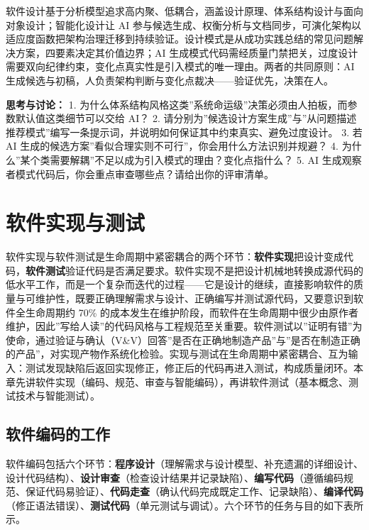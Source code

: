 \documentclass[12pt,a4paper,twoside,openany]{ctexbook}
\numberwithin{figure}{chapter}
\numberwithin{table}{chapter}
\begin{document}
软件设计基于分析模型追求高内聚、低耦合，涵盖设计原理、体系结构设计与面向对象设计；智能化设计让
AI
参与候选生成、权衡分析与文档同步，可演化架构以适应度函数把架构治理迁移到持续验证。设计模式是从成功实践总结的常见问题解决方案，四要素决定其价值边界；AI
生成模式代码需经质量门禁把关，过度设计需要双向纪律约束，变化点真实性是引入模式的唯一理由。两者的共同原则：AI
生成候选与初稿，人负责架构判断与变化点裁决------验证优先，决策在人。

\textbf{思考与讨论：} 1.
为什么体系结构风格这类''系统命运级''决策必须由人拍板，而参数默认值这类细节可以交给
AI？ 2.
请分别为''候选设计方案生成''与''从问题描述推荐模式''编写一条提示词，并说明如何保证其中约束真实、避免过度设计。
3. 若 AI
生成的候选方案''看似合理实则不可行''，你会用什么方法识别并规避？ 4.
为什么''某个类需要解耦''不足以成为引入模式的理由？变化点指什么？ 5. AI
生成观察者模式代码后，你会重点审查哪些点？请给出你的评审清单。

\chapter{软件实现与测试}\label{ux8f6fux4ef6ux5b9eux73b0ux4e0eux6d4bux8bd5}

软件实现与软件测试是生命周期中紧密耦合的两个环节：\textbf{软件实现}把设计变成代码，\textbf{软件测试}验证代码是否满足要求。软件实现不是把设计机械地转换成源代码的低水平工作，而是一个复杂而迭代的过程------它是设计的继续，直接影响软件的质量与可维护性，既要正确理解需求与设计、正确编写并测试源代码，又要意识到软件全生命周期约
70\%
的成本发生在维护阶段，而软件在生命周期中很少由原作者维护，因此''写给人读''的代码风格与工程规范至关重要。软件测试以''证明有错''为使命，通过验证与确认（V\&V）回答''是否在正确地制造产品''与''是否在制造正确的产品''，对实现产物作系统化检验。实现与测试在生命周期中紧密耦合、互为输入：测试发现缺陷后返回实现修正，修正后的代码再进入测试，构成质量闭环。本章先讲软件实现（编码、规范、审查与智能编码），再讲软件测试（基本概念、测试技术与智能测试）。

\section{软件编码的工作}\label{ux8f6fux4ef6ux7f16ux7801ux7684ux5de5ux4f5c}

软件编码包括六个环节：\textbf{程序设计}（理解需求与设计模型、补充遗漏的详细设计、设计代码结构）、\textbf{设计审查}（检查设计结果并记录缺陷）、\textbf{编写代码}（遵循编码规范、保证代码易验证）、\textbf{代码走查}（确认代码完成既定工作、记录缺陷）、\textbf{编译代码}（修正语法错误）、\textbf{测试代码}（单元测试与调试）。六个环节的任务与目的如下表所示。
\end{document}
